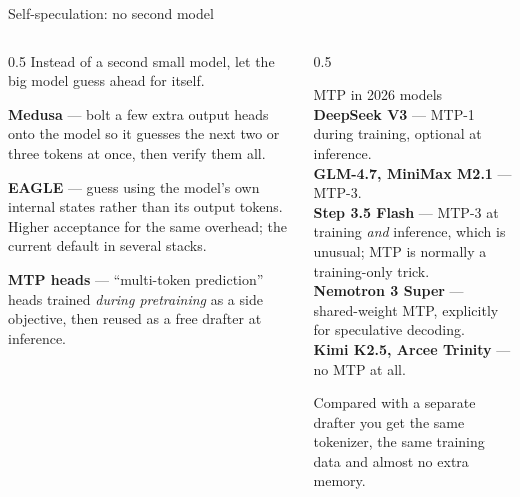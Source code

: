 \documentclass[aspectratio=169,10pt]{beamer}
\begin{document}
\begin{frame}[shrink=3]{Self-speculation: no second model}
  \begin{columns}[T]
    \begin{column}{0.5\textwidth}
      Instead of a second small model, let the big model guess ahead for
      itself.
      \vspace{0.4em}

      \textbf{Medusa} --- bolt a few extra output heads onto the model so it
      guesses the next two or three tokens at once, then verify them all.
      \vspace{0.4em}

      \textbf{EAGLE} --- guess using the model's own internal states rather
      than its output tokens. Higher acceptance for the same overhead; the
      current default in several stacks.
      \vspace{0.4em}

      \textbf{MTP heads} --- ``multi-token prediction'' heads trained
      \emph{during pretraining} as a side objective, then reused as a free
      drafter at inference.
    \end{column}
    \begin{column}{0.5\textwidth}
      \begin{block}{MTP in 2026 models}
        \small
        \textbf{DeepSeek V3} --- MTP-1 during training, optional at inference.\\[0.3em]
        \textbf{GLM-4.7, MiniMax M2.1} --- MTP-3.\\[0.3em]
        \textbf{Step 3.5 Flash} --- MTP-3 at training \emph{and} inference,
        which is unusual; MTP is normally a training-only trick.\\[0.3em]
        \textbf{Nemotron 3 Super} --- shared-weight MTP, explicitly for
        speculative decoding.\\[0.3em]
        \textbf{Kimi K2.5, Arcee Trinity} --- no MTP at all.
      \end{block}
      \vspace{0.2em}
      \small
      Compared with a separate drafter you get the same tokenizer, the same
      training data and almost no extra memory.
    \end{column}
  \end{columns}
\end{frame}
\end{document}
